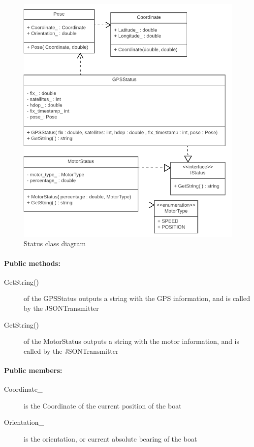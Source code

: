 \begin{figure}[H]
\centering
\includegraphics[width=1\linewidth]{Images/Design/Status_class_diagram}
\caption{Status class diagram}
\label{fig:status}
\end{figure}

\paragraph{Public methods:}
\begin{adjustwidth}{2.5em}{0pt}\begin{description}
		\item [GetString()] of the GPSStatus outputs a string with the GPS information, and is called by the JSONTransmitter
		\item [GetString()] of the MotorStatus outputs a string with the motor information, and is called by the JSONTransmitter
\end{description}\end{adjustwidth}

\paragraph{Public members:}
\begin{adjustwidth}{2.5em}{0pt}\begin{description}
		\item [Coordinate_] is the Coordinate of the current position of the boat 
		\item [Orientation_] is the orientation, or current absolute bearing of the boat
\end{description}\end{adjustwidth}

